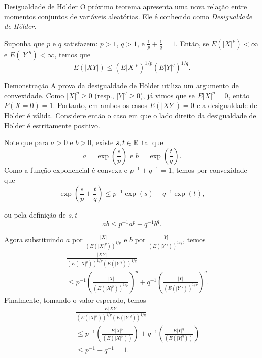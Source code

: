 %
\begin{frame}{Desigualdade de Hölder}
%
%
%
O próximo teorema apresenta uma nova relação entre momentos conjuntos de variáveis aleatórias. Ele é conhecido como {\em Desigualdade de Hölder}.
%
\begin{teo}
Suponha que $p$ e $q$ satisfazem: $p>1$, $q>1$, e $\frac{1}{p}+\frac{1}{q}=1$. Então, se $E(|X|^p)<\infty$ e $E(|Y|^q)<\infty$, temos que
$$E(|XY|)\leq (E|X|^p)^{1/p}(E|Y|^q)^{1/q}.$$
\end{teo}
%
%
%
%
%
\begin{block}{Demonstração}
A prova da desigualdade de Hölder utiliza um argumento de convexidade. Como $|X|^p\geq 0$ (resp., $|Y|^q\geq 0$), já vimos que se $E|X|^p=0$, então $P(X=0)=1$. Portanto, em ambos os casos $E(|XY|)=0$ e a desigualdade de Hölder é válida. Considere então o caso em que o lado direito da desigualdade de Hölder é estritamente positivo.

Note que para $a>0$ e $b>0$, existe $s,t\in\mathbb{R}$ tal que
$$a=\exp(\frac{s}{p})\mbox{ e }b=\exp(\frac{t}{q}).$$
Como a função exponencial é convexa e $p^{-1}+q^{-1}=1$, temos por convexidade que
$$\exp(\frac{s}{p}+\frac{t}{q})\leq p^{-1}\exp(s)+q^{-1}\exp(t),$$

\end{block}
\end{frame}
%
\begin{frame}
\begin{block}{}
	ou pela definição de $s,t$
	$$ab\leq p^{-1}a^p+q^{-1}b^q.$$


Agora substituindo $a$ por $\frac{|X|}{(E(|X|^p))^{1/p}}$ e $b$ por $\frac{|Y|}{(E(|Y|^q))^{1/q}}$, temos
\begin{eqnarray}
& & \frac{|XY|}{(E(|X|^p))^{1/p}(E(|Y|^q))^{1/q}}\nonumber\\
& & \leq p^{-1}(\frac{|X|}{(E(|X|^p))^{1/p}})^p+q^{-1}(\frac{|Y|}{(E(|Y|^q))^{1/q}})^q.\nonumber
\end{eqnarray}
Finalmente, tomando o valor esperado, temos
\begin{eqnarray}
& & \frac{E|XY|}{(E(|X|^p))^{1/p}(E(|Y|^q))^{1/q}} \nonumber\\
& & \leq p^{-1}(\frac{E|X|^p}{(E(|X|^p))})+q^{-1}(\frac{E|Y|^q}{(E(|Y|^q))})\nonumber\\
& &  \leq p^{-1}+q^{-1}=1.\nonumber
\end{eqnarray}
\end{block}
\end{frame}
%


